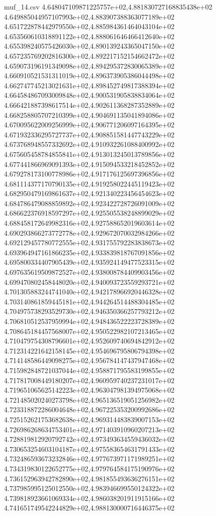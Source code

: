 \begin{filecontents*}{muf_14.csv}
4.648047109871225757e+02,4.881830727168835438e+02
4.649885044957107993e+02,4.883907388363077189e+02
4.651722878442979550e+02,4.885984361464043104e+02
4.653560610318891122e+02,4.888061646466412640e+02
4.655398240575426030e+02,4.890139243365047150e+02
4.657235769202816300e+02,4.892217152154662472e+02
4.659073196191349098e+02,4.894295372830065389e+02
4.660910521531311019e+02,4.896373905386044498e+02
4.662747745213021631e+02,4.898452749817388394e+02
4.664584867093009848e+02,4.900531905838834064e+02
4.666421887398617514e+02,4.902611368287352889e+02
4.668258805707210399e+02,4.904691135041894086e+02
4.670095622009256999e+02,4.906771206097164395e+02
4.671932336295727737e+02,4.908851581447743229e+02
4.673768948557332692e+02,4.910932261088400992e+02
4.675605458784855841e+02,4.913013245013789856e+02
4.677441866969091393e+02,4.915094533218452852e+02
4.679278173100778986e+02,4.917176125697396856e+02
4.681114377170790135e+02,4.919258022445119423e+02
4.682950479169861637e+02,4.921340223456454623e+02
4.684786479088859892e+02,4.923422728726091009e+02
4.686622376918597297e+02,4.925505538248899029e+02
4.688458172649982316e+02,4.927588652019603614e+02
4.690293866273772778e+02,4.929672070032984266e+02
4.692129457780772555e+02,4.931755792283838673e+02
4.693964947161866235e+02,4.933839818767091856e+02
4.695800334407905439e+02,4.935924149477523315e+02
4.697635619509872527e+02,4.938008784409903456e+02
4.699470802458448020e+02,4.940093723559293721e+02
4.701305883244741040e+02,4.942178966920446328e+02
4.703140861859445181e+02,4.944264514488304485e+02
4.704975738293529730e+02,4.946350366257793212e+02
4.706810512537959994e+02,4.948436522223728389e+02
4.708645184457568007e+02,4.950522982107213465e+02
4.710479754308796601e+02,4.952609740694842912e+02
4.712314221642158145e+02,4.954696795806794398e+02
4.714148586449098275e+02,4.956784147437947468e+02
4.715982848721037044e+02,4.958871795583199855e+02
4.717817008449180207e+02,4.960959740237231017e+02
4.719651065625142223e+02,4.963047981394975068e+02
4.721485020240273798e+02,4.965136519051256982e+02
4.723318872286004648e+02,4.967225353200992686e+02
4.725152621753682638e+02,4.969314483839007153e+02
4.726986268634753401e+02,4.971403910960207213e+02
4.728819812920792742e+02,4.973493634559436032e+02
4.730653254603104187e+02,4.975583654631791433e+02
4.732486593673232846e+02,4.977673971171989251e+02
4.734319830122652775e+02,4.979764584175190976e+02
4.736152963942782890e+02,4.981855493636276151e+02
4.737985995125012550e+02,4.983946699550124322e+02
4.739818923661069334e+02,4.986038201911915166e+02
4.741651749542244829e+02,4.988130000716446375e+02

\end{filecontents*}

